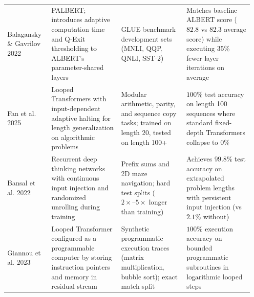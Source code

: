 \documentclass[11pt]{article}
\begin{document}
\begin{table}[h!]
\begin{tabularx}{\textwidth}{@{}p{2.2cm}p{3.8cm}X p{3.8cm}@{}}
Balagansky \& Gavrilov 2022 \cite{balagansky2022palbert} & PALBERT; introduces adaptive computation time and Q-Exit thresholding to ALBERT's parameter-shared layers & GLUE benchmark development sets (MNLI, QQP, QNLI, SST-2) & Matches baseline ALBERT score ($82.8$ vs $82.3$ average score) while executing $35\%$ fewer layer iterations on average\\
Fan et al. 2025 \cite{fan2025looped} & Looped Transformers with input-dependent adaptive halting for length generalization on algorithmic problems & Modular arithmetic, parity, and sequence copy tasks; trained on length 20, tested on length 100+ & $100\%$ test accuracy on length 100 sequences where standard fixed-depth Transformers collapse to $0\%$\\
Bansal et al. 2022 \cite{bansal2022endtoend} & Recurrent deep thinking networks with continuous input injection and randomized unrolling during training & Prefix sums and 2D maze navigation; hard test splits ($2\times\text{--}5\times$ longer than training) & Achieves $99.8\%$ test accuracy on extrapolated problem lengths with persistent input injection (vs $2.1\%$ without)\\
Giannou et al. 2023 \cite{giannou2023looped} & Looped Transformer configured as a programmable computer by storing instruction pointers and memory in residual stream & Synthetic programmatic execution traces (matrix multiplication, bubble sort); exact match split & $100\%$ execution accuracy on bounded programmatic subroutines in logarithmic looped steps\\
\bottomrule
\end{tabularx}
\end{table}

\end{document}
